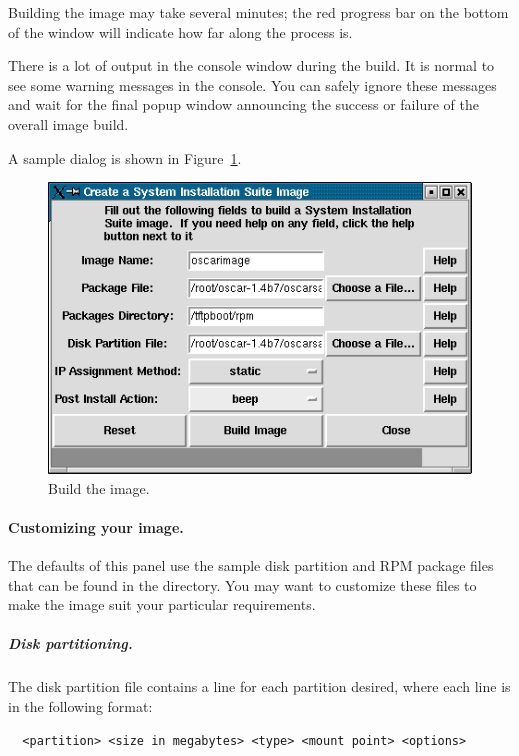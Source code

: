 Building the image may take several minutes; the red progress bar on
the bottom of the window will indicate how far along the process is.

There is a lot of output in the console window during the build.  It
is normal to see some warning messages in the console.  You can safely
ignore these messages and wait for the final popup window announcing
the success or failure of the overall image build.
  
A sample dialog is shown in Figure~\ref{fig:detailed-build-image}.

\begin{figure}[htbp]
  \begin{center}
    \includegraphics[scale=\imgscale]{figs/4a_sbs-build-image1}
    \caption{Build the image.}
    \label{fig:detailed-build-image}
  \end{center}
\end{figure}
  
\paragraph{Customizing your image.}

The defaults of this panel use the sample disk partition and RPM
package files that can be found in the  directory.
You may want to customize these files to make the image suit your
particular requirements.

\subparagraph{Disk partitioning.}

The disk partition file contains a line for each partition desired,
where each line is in the following format:

\begin{verbatim}
  <partition> <size in megabytes> <type> <mount point> <options>
\end{verbatim}

